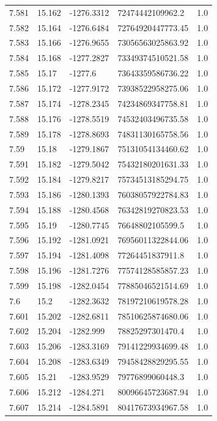 \begin{tabular}{lllll}
7.581 & 15.162 & -1276.3312 & 72474442109962.2 & 1.0 \\
7.582 & 15.164 & -1276.6484 & 72764920447773.45 & 1.0 \\
7.583 & 15.166 & -1276.9655 & 73056563025863.92 & 1.0 \\
7.584 & 15.168 & -1277.2827 & 73349374510521.58 & 1.0 \\
7.585 & 15.17 & -1277.6 & 73643359586736.22 & 1.0 \\
7.586 & 15.172 & -1277.9172 & 73938522958275.06 & 1.0 \\
7.587 & 15.174 & -1278.2345 & 74234869347758.81 & 1.0 \\
7.588 & 15.176 & -1278.5519 & 74532403496735.58 & 1.0 \\
7.589 & 15.178 & -1278.8693 & 74831130165758.56 & 1.0 \\
7.59 & 15.18 & -1279.1867 & 75131054134460.62 & 1.0 \\
7.591 & 15.182 & -1279.5042 & 75432180201631.33 & 1.0 \\
7.592 & 15.184 & -1279.8217 & 75734513185294.75 & 1.0 \\
7.593 & 15.186 & -1280.1393 & 76038057922784.83 & 1.0 \\
7.594 & 15.188 & -1280.4568 & 76342819270823.53 & 1.0 \\
7.595 & 15.19 & -1280.7745 & 76648802105599.5 & 1.0 \\
7.596 & 15.192 & -1281.0921 & 76956011322844.06 & 1.0 \\
7.597 & 15.194 & -1281.4098 & 77264451837911.8 & 1.0 \\
7.598 & 15.196 & -1281.7276 & 77574128585857.23 & 1.0 \\
7.599 & 15.198 & -1282.0454 & 77885046521514.69 & 1.0 \\
7.6 & 15.2 & -1282.3632 & 78197210619578.28 & 1.0 \\
7.601 & 15.202 & -1282.6811 & 78510625874680.06 & 1.0 \\
7.602 & 15.204 & -1282.999 & 78825297301470.4 & 1.0 \\
7.603 & 15.206 & -1283.3169 & 79141229934699.48 & 1.0 \\
7.604 & 15.208 & -1283.6349 & 79458428829295.55 & 1.0 \\
7.605 & 15.21 & -1283.9529 & 79776899060448.3 & 1.0 \\
7.606 & 15.212 & -1284.271 & 80096645723687.94 & 1.0 \\
7.607 & 15.214 & -1284.5891 & 80417673934967.58 & 1.0 \\

\end{tabular}
